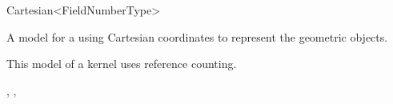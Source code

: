 \begin{ccRefClass}{Cartesian<FieldNumberType>}

\ccDefinition
A model for a  using Cartesian coordinates to represent the
geometric objects.

\ccRefines
{}

\ccTypes
{}
\ccGlue
{}

\ccImplementation
This model of a kernel uses reference counting.

\ccSeeAlso
{}, ,
\end{ccRefClass}
